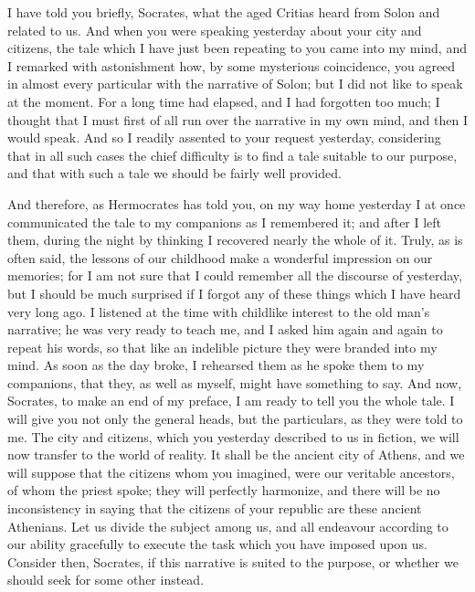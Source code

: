 \documentclass[11pt,letter]{article}
\begin{document}
\par  I have told you briefly, Socrates, what the aged Critias heard from Solon and related to us. And when you were speaking yesterday about your city and citizens, the tale which I have just been repeating to you came into my mind, and I remarked with astonishment how, by some mysterious coincidence, you agreed in almost every particular with the narrative of Solon; but I did not like to speak at the moment. For a long time had elapsed, and I had forgotten too much; I thought that I must first of all run over the narrative in my own mind, and then I would speak. And so I readily assented to your request yesterday, considering that in all such cases the chief difficulty is to find a tale suitable to our purpose, and that with such a tale we should be fairly well provided.

\par  And therefore, as Hermocrates has told you, on my way home yesterday I at once communicated the tale to my companions as I remembered it; and after I left them, during the night by thinking I recovered nearly the whole of it. Truly, as is often said, the lessons of our childhood make a wonderful impression on our memories; for I am not sure that I could remember all the discourse of yesterday, but I should be much surprised if I forgot any of these things which I have heard very long ago. I listened at the time with childlike interest to the old man’s narrative; he was very ready to teach me, and I asked him again and again to repeat his words, so that like an indelible picture they were branded into my mind. As soon as the day broke, I rehearsed them as he spoke them to my companions, that they, as well as myself, might have something to say. And now, Socrates, to make an end of my preface, I am ready to tell you the whole tale. I will give you not only the general heads, but the particulars, as they were told to me. The city and citizens, which you yesterday described to us in fiction, we will now transfer to the world of reality. It shall be the ancient city of Athens, and we will suppose that the citizens whom you imagined, were our veritable ancestors, of whom the priest spoke; they will perfectly harmonize, and there will be no inconsistency in saying that the citizens of your republic are these ancient Athenians. Let us divide the subject among us, and all endeavour according to our ability gracefully to execute the task which you have imposed upon us. Consider then, Socrates, if this narrative is suited to the purpose, or whether we should seek for some other instead.
\end{document}
